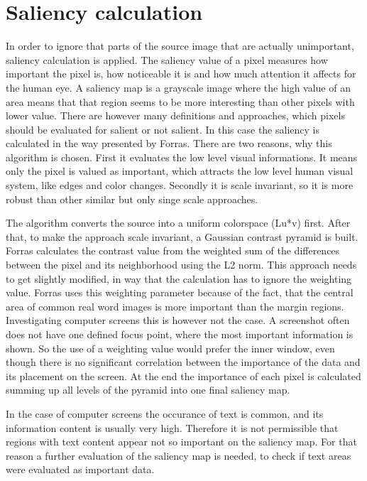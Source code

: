 \documentclass[draft,final]{vutinfth} %
\begin{document}
	\section{Saliency calculation}
	In order to ignore that parts of the source image that are actually unimportant, saliency calculation is applied.
	The saliency value of a pixel measures how important the pixel is, how noticeable it is and how much attention it affects for the human eye.
	A saliency map is a grayscale image where the high value of an area means that that region seems to be more interesting than other pixels with lower value.
	There are however many definitions and approaches, which pixels should be evaluated for salient or not salient.
	In this case the saliency is calculated in the way presented by Forras. 
	There are two reasons, why this algorithm is chosen.
	First it evaluates the low level visual informations.
	It means only the pixel is valued as important, which attracts the low level human visual system, like edges and color changes.
	Secondly it is scale invariant, so it is more robust than other similar but only singe scale approaches.\par 
	The algorithm converts the source into a uniform colorspace (Lu*v) first.
	After that, to make the approach scale invariant, a Gaussian contrast pyramid is built.
	Forras calculates the contrast value from the weighted sum of  the  differences between the pixel and its neighborhood using the L2 norm.
	This approach needs to get slightly modified, in way that the calculation has to ignore the weighting value.
	Forras uses this weighting parameter because of the fact, that the central area of common real word images is more important than the margin regions.
	Investigating computer screens this is however not the case.
	A screenshot often does not have one defined focus point, where the most important information is shown.
	So the use of a weighting value would prefer the inner window, even though there is no significant correlation between the importance of the data and its placement on the screen.
	At the end the importance of each pixel is calculated summing up all levels of the pyramid into one final saliency map.\par
	In the case of computer screens the occurance of text is common, and its information content is usually very high.
	Therefore it is not permissible that regions with text content appear not so important on the saliency map.
	For that reason a further evaluation of the saliency map is needed, to check if text areas were evaluated as important data.\par 
\end{document}
